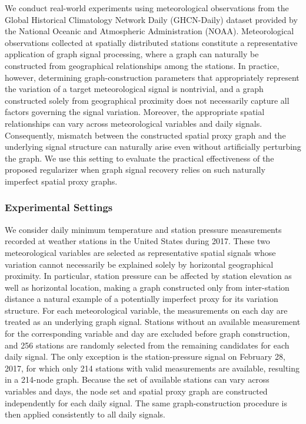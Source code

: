 We conduct real-world experiments using meteorological observations from the Global Historical Climatology Network Daily (GHCN-Daily) dataset \cite{Menne2012GHCNDaily} provided by the National Oceanic and Atmospheric Administration (NOAA).
Meteorological observations collected at spatially distributed stations constitute a representative application of graph signal processing, where a graph can naturally be constructed from geographical relationships among the stations.
In practice, however, determining graph-construction parameters that appropriately represent the variation of a target meteorological signal is nontrivial, and a graph constructed solely from geographical proximity does not necessarily capture all factors governing the signal variation.
Moreover, the appropriate spatial relationships can vary across meteorological variables and daily signals.
Consequently, mismatch between the constructed spatial proxy graph and the underlying signal structure can naturally arise even without artificially perturbing the graph.
We use this setting to evaluate the practical effectiveness of the proposed regularizer when graph signal recovery relies on such naturally imperfect spatial proxy graphs.

\subsubsection{Experimental Settings}

We consider daily minimum temperature and station pressure measurements recorded at weather stations in the United States during 2017.
These two meteorological variables are selected as representative spatial signals whose variation cannot necessarily be explained solely by horizontal geographical proximity.
In particular, station pressure can be affected by station elevation as well as horizontal location, making a graph constructed only from inter-station distance a natural example of a potentially imperfect proxy for its variation structure.
For each meteorological variable, the measurements on each day are treated as an underlying graph signal.
Stations without an available measurement for the corresponding variable and day are excluded before graph construction, and 256 stations are randomly selected from the remaining candidates for each daily signal.
The only exception is the station-pressure signal on February 28, 2017, for which only 214 stations with valid measurements are available, resulting in a 214-node graph.
Because the set of available stations can vary across variables and days, the node set and spatial proxy graph are constructed independently for each daily signal.
The same graph-construction procedure is then applied consistently to all daily signals.

